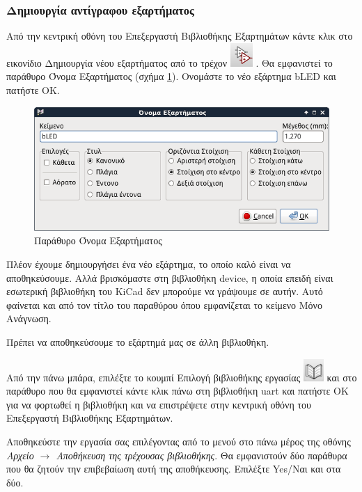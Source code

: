 \documentclass[a4paper]{article}
\begin{document}
\subsubsection{Δημιουργία αντίγραφου εξαρτήματος}

Από την κεντρική οθόνη του Επεξεργαστή Βιβλιοθήκης Εξαρτημάτων κάντε κλικ στο εικονίδιο Δημιουργία νέου εξαρτήματος από το τρέχον \includegraphics[scale=.5]{img/libed-ico-copycomp.png}
. Θα εμφανιστεί το παράθυρο Όνομα Εξαρτήματος (σχήμα \ref{fig:libed-dial-compname}). Ονομάστε το νέο εξάρτημα bLED και πατήστε ΟΚ.

\begin{figure}
  \begin{center}
    \includegraphics[width=.5\textwidth]{img/libed-dial-compname.png}
    \caption{Παράθυρο Όνομα Εξαρτήματος}
    \label{fig:libed-dial-compname}
  \end{center}
\end{figure}

Πλέον έχουμε δημιουργήσει ένα νέο εξάρτημα, το οποίο καλό είναι να αποθηκεύσουμε. Αλλά βρισκόμαστε στη βιβλιοθήκη device, η οποία επειδή είναι εσωτερική βιβλιοθήκη του \textenglish{KiCad} δεν μπορούμε να γράψουμε σε αυτήν. Αυτό φαίνεται και από τον τίτλο του παραθύρου όπου εμφανίζεται το κείμενο Μόνο Ανάγνωση.

Πρέπει να αποθηκεύσουμε το εξάρτημά μας σε άλλη βιβλιοθήκη.

Από την πάνω μπάρα, επιλέξτε το κουμπί Επιλογή βιβλιοθήκης εργασίας \includegraphics[scale=.5]{img/libed-ico-selnewlib.png}
και στο παράθυρο που θα εμφανιστεί κάντε κλικ πάνω στη βιβλιοθήκη uart και πατήστε ΟΚ για να φορτωθεί η βιβλιοθήκη και να επιστρέψετε στην κεντρική οθόνη του Επεξεργαστή Βιβλιοθήκης Εξαρτημάτων.

Αποθηκεύστε την εργασία σας επιλέγοντας από το μενού στο πάνω μέρος της οθόνης \textit{Αρχείο $\rightarrow$ Αποθήκευση της τρέχουσας βιβλιοθήκης}. Θα εμφανιστούν δύο παράθυρα που θα ζητούν την επιβεβαίωση αυτή της αποθήκευσης. Επιλέξτε Yes/Ναι και στα δύο.
\end{document}
